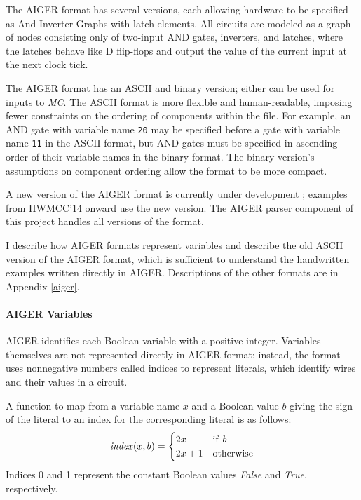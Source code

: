 \documentclass[12pt,a4paper,twoside,openright]{report}
\begin{document}
{The AIGER format has several versions, each allowing hardware to be
specified as
And-Inverter Graphs with latch elements.
All circuits are modeled as a graph of nodes consisting only of
two-input AND gates, inverters, and latches, where the latches behave like D
flip-flops and output the value of the current input at the next
clock tick.

The AIGER format has an ASCII and binary version; either
can be used for inputs to \emph{MC}. The ASCII
format is more flexible and human-readable, imposing fewer constraints
on the ordering of components within the file. For example, an
AND gate with variable name {\tt 20} may be specified before a gate with
variable name {\tt 11} in the ASCII format, but AND gates must be specified in
ascending order of their variable names in the binary format.
The binary version's assumptions on component ordering allow the format
to be more compact.

A new version of the AIGER format is currently under development \cite{aiger};
examples from HWMCC'14 onward use the new version. The AIGER parser component
of this project handles all versions of the format.

I describe how AIGER formats represent variables
and describe the old ASCII version of the AIGER format, which
is sufficient to understand the handwritten examples written directly
in AIGER. Descriptions of the other formats are in Appendix
\ref{aiger}.

\paragraph{AIGER Variables}{
AIGER identifies each Boolean variable with a positive integer.
Variables themselves are not represented directly in AIGER format; instead, the
format uses nonnegative numbers called indices to represent literals,
which identify wires and their values in a circuit.

A function to map from a variable name $x$ and a Boolean
value $b$ giving the sign of the literal to an index for
the corresponding literal is as follows:
$${\it index}(x, b) =
\begin{cases}
2x & {\rm if}~b \\
2x + 1 & {\rm otherwise}
\end{cases}$$
Indices 0 and 1 represent the constant Boolean values {\it False}
and {\it True}, respectively.

}}
\end{document}
